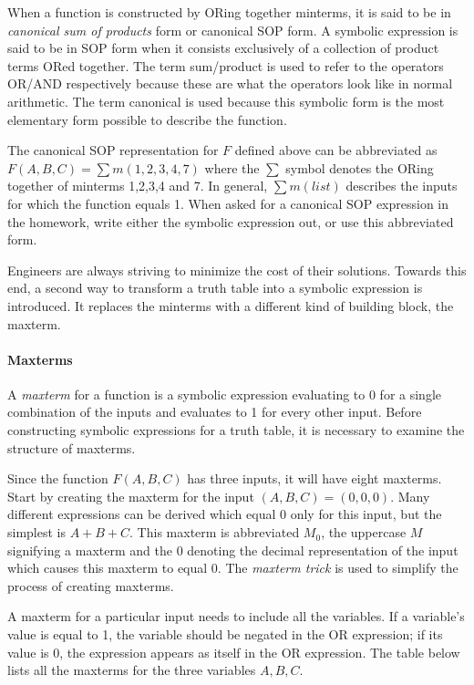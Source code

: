 When a function is constructed by ORing together minterms, it is
said to be in \textit{canonical sum of products}
 form or canonical SOP form.  A symbolic
expression is said to be in SOP form when it consists
exclusively of a collection of product terms ORed together.
The term sum/product is used to refer to the operators OR/AND
respectively because these are what the operators look like in
normal arithmetic. The term canonical is used because this
symbolic form is the most elementary form possible to describe
the function.

The canonical SOP representation for $F$ defined above can be
abbreviated as $F(A,B,C) = \sum m(1,2,3,4,7)$  where the $\sum$
symbol denotes the ORing together of minterms 1,2,3,4 and 7.
In general, $\sum m(list)$ describes the inputs for which the
function equals 1.  When asked for a canonical SOP expression
in the homework, write either the symbolic expression
out, or use this abbreviated form.

Engineers are always striving to minimize the cost of their solutions.
Towards this end, a second way to transform a truth table into a
symbolic expression is introduced.  It replaces the minterms with
a different kind of building block, the maxterm.

\paragraph{Maxterms}
A \textit{maxterm} for a function is a symbolic expression evaluating
to 0 for a single combination of the inputs and evaluates to 1 for
every other input.  Before constructing symbolic expressions for
a truth table, it is necessary to examine the structure of maxterms.

Since the function $F(A,B,C)$ has three inputs, it will have eight
maxterms.  Start by creating the maxterm for the input $(A,B,C)=(0,0,0)$.
Many different expressions can be derived which equal 0 only for
this input, but the simplest is $A+B+C$.  This maxterm is
abbreviated $M_0$, the uppercase $M$ signifying a maxterm
and the 0 denoting the decimal representation of the input which
causes this maxterm to equal 0.  The \textit{maxterm trick}
 is used to simplify the process of creating
maxterms.

A maxterm for a particular input needs to include all the variables.
If a variable's value is equal to 1, the variable should be negated
in the OR expression; if its value is 0, the expression appears as itself in the
OR expression. The table below lists all the maxterms for the three
variables $A,B,C$.

